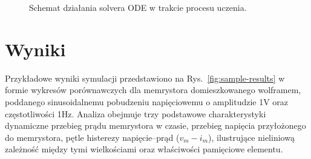 \documentclass[11pt, oneside]{article}
\begin{document}
\begin{figure}[H]
    \centering
    \resizebox{\linewidth}{!}{%
        
    }
    \caption{Schemat działania solvera ODE w trakcie procesu uczenia.}
    \label{fig:nn-arch}
\end{figure}

\section{Wyniki}

Przykładowe wyniki symulacji przedstawiono na Rys.~\ref{fig:sample-results} w formie wykresów porównawczych dla memrystora domieszkowanego wolframem, poddanego sinusoidalnemu pobudzeniu napięciowemu o amplitudzie 1V oraz częstotliwości 1Hz. Analiza obejmuje trzy podstawowe charakterystyki dynamiczne przebieg prądu memrystora w czasie, przebieg napięcia przyłożonego do memrystora, pętle histerezy  napięcie–prąd ($v_m - i_m$), ilustrujące nieliniową zależność między tymi wielkościami oraz właściwości pamięciowe elementu.
\end{document}
